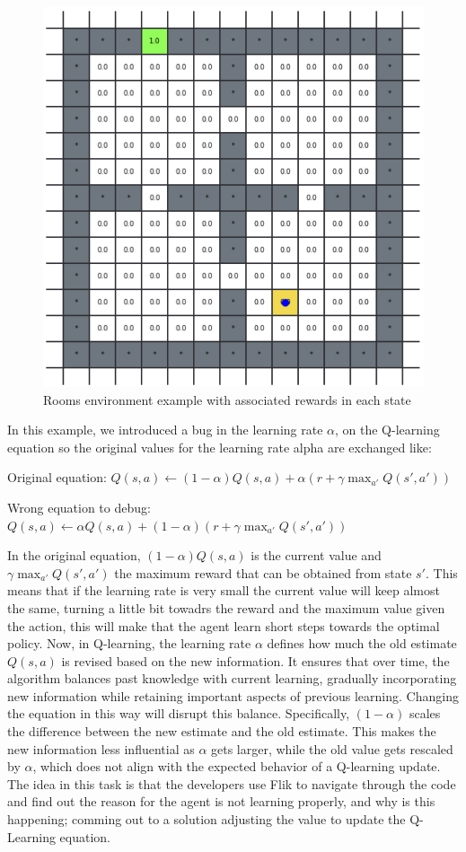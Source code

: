 \begin{figure}[h]
  \centering
  \includegraphics[width=0.5\columnwidth]{figures/rooms.png}
  \caption{Rooms environment example with associated rewards in each state}
  \label{fig:rooms}
\end{figure}

In this example, we introduced a bug in the learning rate $\alpha$, on the Q-learning equation 
so the original values for the learning rate alpha are exchanged like:

Original equation:
$
Q(s, a) \leftarrow (1-\alpha) Q(s, a) + \alpha \left( r + \gamma \max_{a'} Q(s', a') \right)
$

Wrong equation to debug:
$
Q(s, a) \leftarrow  \alpha Q(s, a) + (1-\alpha) \left( r + \gamma \max_{a'} Q(s', a') \right)
$

In the original equation,  $(1-\alpha) Q(s, a)$ is the current value and $\gamma \max_{a'} Q(s', a')$ 
the maximum reward that can be obtained from state $s'$. This means that if the learning rate is very 
small the current value will keep almost the same, turning a little bit towadrs the reward and the 
maximum value given the action, this will make that the agent learn short steps towards the 
optimal policy. Now, in Q-learning, the learning rate $\alpha$ defines how much the old estimate $Q(s,a)$ 
is revised based on the new information. It ensures that over time, the algorithm balances past 
knowledge with current learning, gradually incorporating new information while retaining important 
aspects of previous learning. Changing the equation in this way will disrupt this balance. Specifically,
$(1-\alpha)$ scales the difference between the new estimate and the old estimate. This makes the new 
information less influential as $\alpha$ gets larger, while the old value gets rescaled by $\alpha$, 
which does not align with the expected behavior of a Q-learning update. The idea in this task is that 
the developers use \ac{Flik} to navigate through the code and find out the reason for the agent is not 
learning properly, and why is this happening; comming out to a solution adjusting the value to update the 
Q-Learning equation.


